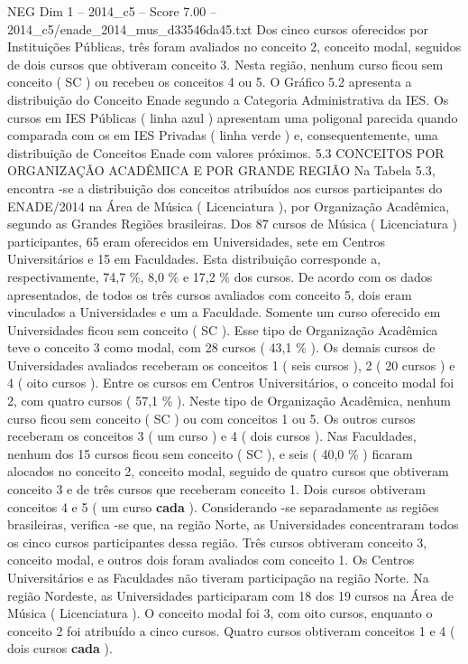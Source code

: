 \begin{textsample}{NEG Dim 1 – 2014\_c5 – Score 7.00 – 2014\_c5/enade\_2014\_mus\_d33546da45.txt}
Dos cinco cursos oferecidos por Instituições Públicas, três foram avaliados no conceito 2, conceito modal, seguidos de dois cursos que obtiveram conceito 3.
Nesta região, nenhum curso ficou sem conceito ( SC ) ou recebeu os conceitos 4 ou 5.
O Gráfico 5.2 apresenta a distribuição do Conceito Enade segundo a Categoria Administrativa da IES.
Os cursos em IES Públicas ( linha azul ) apresentam uma poligonal parecida quando comparada com os em IES Privadas ( linha verde ) e, consequentemente, uma distribuição de Conceitos Enade com valores próximos. 5.3 CONCEITOS POR ORGANIZAÇÃO ACADÊMICA E POR GRANDE REGIÃO Na Tabela 5.3, encontra -se a distribuição dos conceitos atribuídos aos cursos participantes do ENADE/2014 na Área de Música ( Licenciatura ), por Organização Acadêmica, segundo as Grandes Regiões brasileiras.
Dos 87 cursos de Música ( Licenciatura ) participantes, 65 eram oferecidos em Universidades, sete em Centros Universitários e 15 em Faculdades.
Esta distribuição corresponde a, respectivamente, 74,7 \%, 8,0 \% e 17,2 \% dos cursos.
De acordo com os dados apresentados, de todos os três cursos avaliados com conceito 5, dois eram vinculados a Universidades e um a Faculdade.
Somente um curso oferecido em Universidades ficou sem conceito ( SC ).
Esse tipo de Organização Acadêmica teve o conceito 3 como modal, com 28 cursos ( 43,1 \% ).
Os demais cursos de Universidades avaliados receberam os conceitos 1 ( seis cursos ), 2 ( 20 cursos ) e 4 ( oito cursos ).
Entre os cursos em Centros Universitários, o conceito modal foi 2, com quatro cursos ( 57,1 \% ).
Neste tipo de Organização Acadêmica, nenhum curso ficou sem conceito ( SC ) ou com conceitos 1 ou 5.
Os outros cursos receberam os conceitos 3 ( um curso ) e 4 ( dois cursos ).
Nas Faculdades, nenhum dos 15 cursos ficou sem conceito ( SC ), e seis ( 40,0 \% ) ficaram alocados no conceito 2, conceito modal, seguido de quatro cursos que obtiveram conceito 3 e de três cursos que receberam conceito 1.
Dois cursos obtiveram conceitos 4 e 5 ( um curso \textbf{cada} ).
Considerando -se separadamente as regiões brasileiras, verifica -se que, na região Norte, as Universidades concentraram todos os cinco cursos participantes dessa região.
Três cursos obtiveram conceito 3, conceito modal, e outros dois foram avaliados com conceito 1.
Os Centros Universitários e as Faculdades não tiveram participação na região Norte.
Na região Nordeste, as Universidades participaram com 18 dos 19 cursos na Área de Música ( Licenciatura ).
O conceito modal foi 3, com oito cursos, enquanto o conceito 2 foi atribuído a cinco cursos.
Quatro cursos obtiveram conceitos 1 e 4 ( dois cursos \textbf{cada} ).

\end{textsample}
